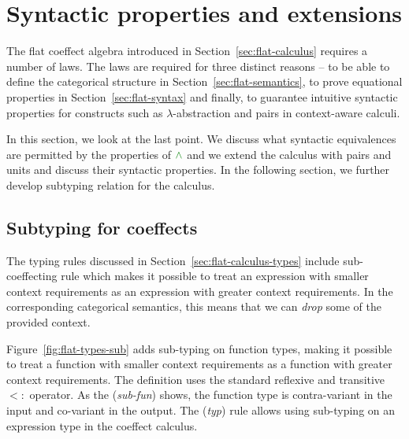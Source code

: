 \section{Syntactic properties and extensions}
\label{sec:flat-exts}

The flat coeffect algebra introduced in Section~\ref{sec:flat-calculus} requires a number of laws.
The laws are required for three distinct reasons -- to be able to define the categorical structure
in Section~\ref{sec:flat-semantics}, to prove equational properties in Section~\ref{sec:flat-syntax}
and finally, to guarantee intuitive syntactic properties for constructs such as 
$\lambda$-abstraction and pairs in context-aware calculi.

In this section, we look at the last point. We discuss what syntactic equivalences are permitted
by the properties of $\czip$ and we extend the calculus with pairs and units and discuss their 
syntactic properties. In the following section, we further develop subtyping relation for the 
calculus.


\subsection{Subtyping for coeffects}

The typing rules discussed in Section~\ref{sec:flat-calculus-types} include sub-coeffecting rule
which makes it possible to treat an expression with smaller context requirements as an expression
with greater context requirements. In the corresponding categorical semantics, this means that
we can \emph{drop} some of the provided context.

Figure~\ref{fig:flat-types-sub} adds sub-typing on function types, making it possible to treat
a function with smaller context requirements as a function with greater context requirements. 
The definition uses the standard reflexive and transitive $<:$ operator. As the (\emph{sub-fun})
shows, the function type is contra-variant in the input and co-variant in the output. The 
(\emph{typ}) rule allows using sub-typing on an expression type in the coeffect calculus.


